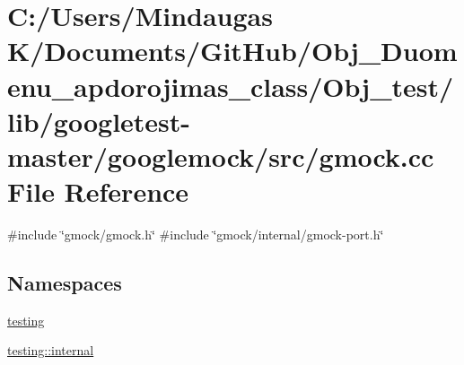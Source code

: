 \hypertarget{_obj__test_2lib_2googletest-master_2googlemock_2src_2gmock_8cc}{}\section{C\+:/\+Users/\+Mindaugas K/\+Documents/\+Git\+Hub/\+Obj\+\_\+\+Duomenu\+\_\+apdorojimas\+\_\+class/\+Obj\+\_\+test/lib/googletest-\/master/googlemock/src/gmock.cc File Reference}
\label{_obj__test_2lib_2googletest-master_2googlemock_2src_2gmock_8cc}
{\ttfamily \#include \char`\"{}gmock/gmock.\+h\char`\"{}}\newline
{\ttfamily \#include \char`\"{}gmock/internal/gmock-\/port.\+h\char`\"{}}\newline
\subsection*{Namespaces}
\begin{DoxyCompactItemize}
\item 
 \mbox{\hyperlink{namespacetesting}{testing}}
\item 
 \mbox{\hyperlink{namespacetesting_1_1internal}{testing\+::internal}}
\end{DoxyCompactItemize}
